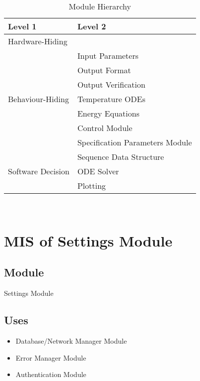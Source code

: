 \documentclass[12pt, titlepage]{article}
\begin{document}
\begin{table}[h!]
\centering
\begin{tabular}{p{} p{}}
\toprule
\textbf{Level 1} & \textbf{Level 2}\\
\midrule

{Hardware-Hiding} & ~ \\
\midrule

\multirow{7}{0.3\textwidth}{Behaviour-Hiding} & Input Parameters\\
& Output Format\\
& Output Verification\\
& Temperature ODEs\\
& Energy Equations\\ 
& Control Module\\
& Specification Parameters Module\\
\midrule

\multirow{3}{0.3\textwidth}{Software Decision} & {Sequence Data Structure}\\
& ODE Solver\\
& Plotting\\
\bottomrule

\end{tabular}
\caption{Module Hierarchy}
\label{TblMH}
\end{table}

\newpage
~\newpage

\section{MIS of Settings Module} \label{Module_Settings}

\subsection{Module}

Settings Module

\subsection{Uses}

\begin{itemize}
    \item Database/Network Manager Module
    \item Error Manager Module
    \item Authentication Module
\end{itemize}
\end{document}
